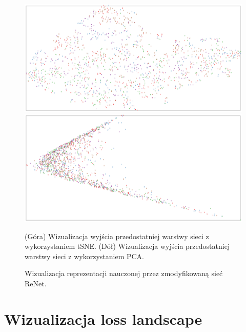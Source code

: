 \documentclass[oneside, mag]{mgr}
\begin{document}
\begin{figure}
\centering
	\includegraphics[width=1.0\textwidth]{img/tSNE_modif_ReNet.png}
	\includegraphics[width=1.0\textwidth]{img/PCA_modif_ReNet.png}
	\caption{Wizualizacja reprezentacji nauczonej przez zmodyfikowaną sieć ReNet.} (Góra) Wizualizacja wyjścia przedostatniej warstwy sieci z wykorzystaniem tSNE. (Dół) Wizualizacja wyjścia przedostatniej warstwy sieci z wykorzystaniem PCA.
	\label{fig:tSNE_modif_ReNet}
\end{figure}

\section{Wizualizacja loss landscape}
\end{document}

